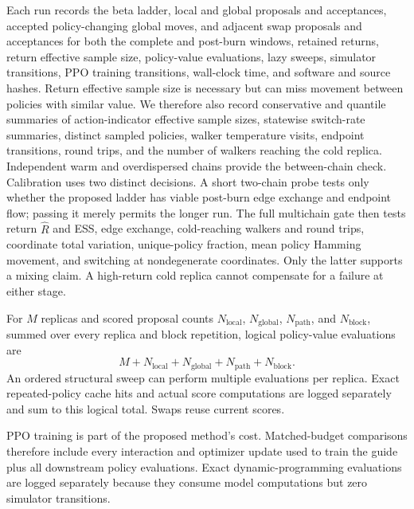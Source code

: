 Each run records the beta ladder, local and global proposals and acceptances,
accepted policy-changing global moves, and adjacent swap proposals and
acceptances for both the complete and post-burn windows, retained returns,
return effective sample size,
policy-value evaluations, lazy sweeps, simulator transitions, PPO training
transitions, wall-clock time, and software and source hashes.  Return effective
sample size is necessary but can miss movement between policies with similar
value.  We therefore also record conservative and quantile summaries of
action-indicator effective sample sizes, statewise switch-rate summaries,
distinct sampled policies, walker temperature visits, endpoint transitions,
round trips, and the number of walkers reaching the cold replica.  Independent
warm and overdispersed chains provide the between-chain check.  Calibration
uses two distinct decisions.  A short two-chain probe tests
only whether the proposed ladder has viable post-burn edge exchange and endpoint
flow; passing it merely permits the longer run.  The full multichain gate then
tests return \(\widehat R\) and ESS, edge exchange, cold-reaching walkers and
round trips, coordinate total variation, unique-policy fraction, mean policy
Hamming movement, and switching at nondegenerate coordinates.  Only the latter
supports a mixing claim.  A high-return cold replica cannot compensate for a
failure at either stage.

For $M$ replicas and scored proposal counts $N_{\mathrm{local}}$,
$N_{\mathrm{global}}$, $N_{\mathrm{path}}$, and $N_{\mathrm{block}}$, summed
over every replica and block repetition, logical policy-value evaluations are
\[
 M+N_{\mathrm{local}}+N_{\mathrm{global}}+
 N_{\mathrm{path}}+N_{\mathrm{block}}.
\]
An ordered structural sweep can perform multiple evaluations per replica.
Exact repeated-policy cache hits and actual score computations are logged
separately and sum to this logical total. Swaps reuse current scores.

PPO training is part of the proposed method's cost.  Matched-budget comparisons
therefore include every interaction and optimizer update used to train the
guide plus all downstream policy evaluations.  Exact dynamic-programming
evaluations are logged separately because they consume model computations but
zero simulator transitions.


